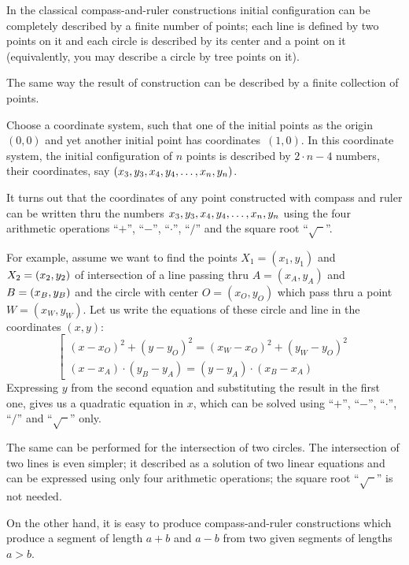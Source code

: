 In the classical compass-and-ruler constructions initial configuration can be completely described by a finite number of points;
each line is defined by two points on it and each circle is described by its center and a point on it (equivalently, you may describe a circle by tree points on it).

The same way the result of construction can be described by a finite collection of points.

Choose a  coordinate system, such that one of the initial points as the origin $(0,0)$ and yet another initial point has coordinates~$(1,0)$.
In this coordinate system,
the initial configuration of $n$ points is described by 
$2\cdot n-4$ numbers, their coordinates, say $(x_3,y_3,x_4,y_4,\z\dots,x_n,y_n)$.

\medskip

It turns out that the coordinates of any point constructed with compass and ruler
can be written thru the numbers $x_3,y_3,x_4,y_4,\z\dots,x_n,y_n$ using the four arithmetic operations ``$+$'', ``$-$'', ``$\cdot$'', ``$/$''
and the square root ``$\sqrt{\phantom{a}}$''.

For example, assume we want to find the points $X_1=(x_1,y_1)$ and $X_2\z=(x_2,y_2)$ of intersection of 
a line passing thru $A=(x_A,y_A)$ and $B\z=(x_B,y_B)$ and
the circle with center $O=(x_O,y_O)$ which pass thru a point $W=(x_W,y_W)$.
Let us write the equations of these circle and line in the coordinates $(x,y)$:
$$
\left[
\begin{matrix}
(x-x_O)^2+(y-y_O)^2=(x_W-x_O)^2+(y_W-y_O)^2    
\\
(x-x_A)\cdot(y_B-y_A)=(y-y_A)\cdot(x_B-x_A)  
\end{matrix}
\right.
$$
Expressing $y$ from the second equation and substituting the result in the first one, gives us a quadratic equation in $x$, 
which can be solved using ``$+$'', ``$-$'', ``$\cdot$'', ``$/$''
and  ``$\sqrt{\phantom{a}}$'' only.

The same can be performed for the intersection of two circles. 
The intersection of two lines is even simpler; 
it described as a solution of two linear equations and can be expressed using only four arithmetic operations;
the square root ``$\sqrt{\phantom{a}}$'' is not needed.

\medskip

On the other hand, it is easy to produce  compass-and-ruler constructions which produce a segment of length $a+b$ and $a-b$ from two given segments of lengths $a>b$.

